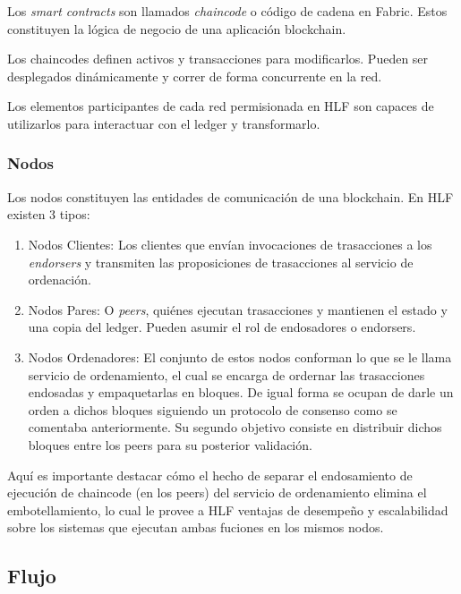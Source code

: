 Los \emph{smart contracts} son llamados \emph{chaincode} o c\'odigo de cadena en Fabric. Estos constituyen la l\'ogica de negocio de una aplicaci\'on blockchain. 

Los chaincodes definen activos y transacciones para modificarlos. Pueden ser desplegados din\'amicamente y correr de forma concurrente en la red.

Los elementos participantes de cada red permisionada en HLF son capaces de utilizarlos para interactuar con el ledger y transformarlo.

\subsubsection{Nodos}

Los nodos constituyen las entidades de comunicaci\'on de una blockchain. En HLF existen 3 tipos:

\begin{enumerate}
	\item Nodos Clientes: Los clientes que env\'ian invocaciones de trasacciones a los \emph{endorsers} y transmiten las proposiciones de trasacciones al servicio de ordenaci\'on.
	
	
	\item Nodos Pares: O \emph{peers}, qui\'enes ejecutan trasacciones y mantienen el estado y una copia del ledger. Pueden asumir el rol de endosadores o endorsers.
	
	\item Nodos Ordenadores: El conjunto de estos nodos conforman lo que se le llama servicio de ordenamiento, el cual se encarga de ordernar las trasacciones endosadas y empaquetarlas en bloques. De igual forma se ocupan de darle un orden a dichos bloques siguiendo un protocolo de consenso como se comentaba anteriormente. Su segundo objetivo consiste en distribuir dichos bloques entre los peers para su posterior validaci\'on.
	
\end{enumerate}

Aqu\'i es importante destacar c\'omo el hecho de separar el endosamiento de ejecuci\'on de chaincode (en los peers) del servicio de ordenamiento elimina el embotellamiento, lo cual le provee a HLF ventajas de desempe\~no y escalabilidad sobre los sistemas que ejecutan ambas fuciones en los mismos nodos.

 
\subsection{Flujo}


